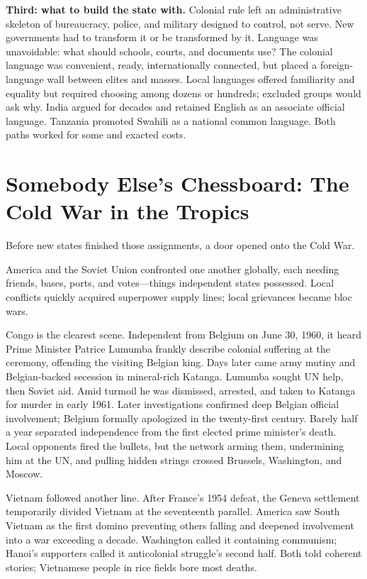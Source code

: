 \textbf{Third: what to build the state with.} Colonial rule left an administrative skeleton of bureaucracy, police, and military designed to control, not serve. New governments had to transform it or be transformed by it. Language was unavoidable: what should schools, courts, and documents use? The colonial language was convenient, ready, internationally connected, but placed a foreign-language wall between elites and masses. Local languages offered familiarity and equality but required choosing among dozens or hundreds; excluded groups would ask why. India argued for decades and retained English as an associate official language. Tanzania promoted Swahili as a national common language. Both paths worked for some and exacted costs.

\section[The Cold War in the Tropics]{Somebody Else's Chessboard: The Cold War in the Tropics}
Before new states finished those assignments, a door opened onto the Cold War.

America and the Soviet Union confronted one another globally, each needing friends, bases, ports, and votes---things independent states possessed. Local conflicts quickly acquired superpower supply lines; local grievances became bloc wars.

Congo is the clearest scene. Independent from Belgium on June 30, 1960, it heard Prime Minister Patrice Lumumba frankly describe colonial suffering at the ceremony, offending the visiting Belgian king. Days later came army mutiny and Belgian-backed secession in mineral-rich Katanga. Lumumba sought UN help, then Soviet aid. Amid turmoil he was dismissed, arrested, and taken to Katanga for murder in early 1961. Later investigations confirmed deep Belgian official involvement; Belgium formally apologized in the twenty-first century. Barely half a year separated independence from the first elected prime minister's death. Local opponents fired the bullets, but the network arming them, undermining him at the UN, and pulling hidden strings crossed Brussels, Washington, and Moscow.

Vietnam followed another line. After France's 1954 defeat, the Geneva settlement temporarily divided Vietnam at the seventeenth parallel. America saw South Vietnam as the first domino preventing others falling and deepened involvement into a war exceeding a decade. Washington called it containing communism; Hanoi's supporters called it anticolonial struggle's second half. Both told coherent stories; Vietnamese people in rice fields bore most deaths.

